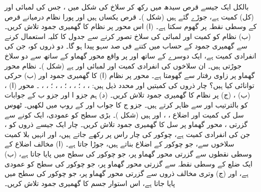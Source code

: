بالکل ایک جیسے  قرص سیدھ میں رکھ کر سلاخ کی شکل میں ، جس کی لمبائی  اور (کل) کمیت   ہے، جوڑے گئے ہیں (شکل )۔ قرص یکساں ہیں اور پورا نظام  درمیانے قرص  کے وسطی نقطہ  پر گھوم سکتا ہے۔ (ا)  اس محور پر نظام کا گھمیری جمود تلاش کریں۔ (ب)  نظام کو     کمیت اور     لمبائی کی سلاخ  تصور کرنے سے  جدول  کا کلیہ استعمال کرنے سے  گھمیری جمود کے حساب میں کتنے فی صد سہو پیدا ہو گا۔
دو ذروں کو،  جن کی انفرادی کمیت  ہے، ایک دوسرے کے ساتھ اور   پر واقع محور گھماو   کے ساتھ سے  دو سلاخ جوڑتی ہیں۔ ان سلاخوں کی انفرادی کمیت اور لمبائی  اور  ہے (شکل )۔ نظام محور گھماو پر  زاوی رفتار سے گھومتا ہے۔  محور  پر نظام (ا) کا گھمیری جمود اور (ب)  حرکی توانائی کیا ہیں؟
چار ذروں کی کمیتیں اور محدد ذیل ہیں: ، ، ؛
  ، ، ؛
   ، ، ؛
    ، ، ۔ محور  (ا) ، (ب) ، (ج)  پر نظام کا گھمیری جمود تلاش کریں۔ (د)  ہم جزو ا اور جزو ب کے جوابات کو بالترتیب  اور  سے ظاہر کرتے ہیں۔ جزو ج کا  جواب  اور  کے روپ  میں لکھیں۔
ٹھوس سل کی کمیت  اور اضلاع ، ، 
اور  ہیں (شکل )۔ بڑی سطح کو عمودی، ایک کونے سے گزرتی  ، محور گھماو  پر  سل کا گھمیری جمود تلاش کریں۔
چار  ایک جیسے ذروں کو ، جن کی انفرادی کمیت  ہے،   چوکور  کی  چار  راس پر رکھے جاتے ہیں، اور انہیں بلا کمیت سلاخوں سے، جو چوکور کے  اضلاع  بناتے ہیں،  جوڑا جاتا ہے۔ (ا) مخالف اضلاع کے وسطی نقطوں  سے گزرتی محور گھماو پر،  جو چوکور کی سطح میں پایا جاتا ہے، (ب)  ایک ضلع کے وسطی نقطہ سے گزرتی محور گھماو پر، جو چوکور کی سطح کو عمودی ہے، اور (ج)  وتری مخالف  ذروں  سے گزرتی محور گھماو پر، جو  چوکور کی سطح میں پایا جاتا ہے، اس استوار جسم کا گھمیری جمود تلاش کریں۔

